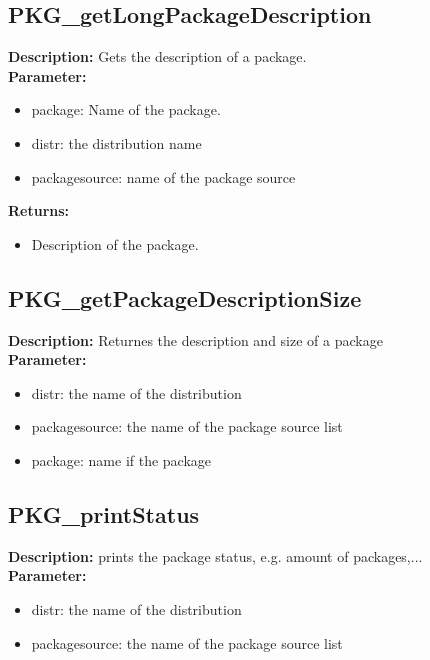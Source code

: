 \subsection{PKG\_getLongPackageDescription}
\textbf{Description:} Gets the description of a package.\\
\textbf{Parameter:}
\begin{itemize}
\item package: Name of the package.
\item distr: the distribution name
\item packagesource: name of the package source
\end{itemize}
\textbf{Returns:}
\begin{itemize}
\item Description of the package.
\end{itemize}

\subsection{PKG\_getPackageDescriptionSize}
\textbf{Description:} Returnes the description and size of a package\\
\textbf{Parameter:}
\begin{itemize}
\item distr: the name of the distribution
\item packagesource: the name of the package source list
\item package: name if the package
\end{itemize}

\subsection{PKG\_printStatus}
\textbf{Description:} prints the package status, e.g. amount of packages,...\\
\textbf{Parameter:}
\begin{itemize}
\item distr: the name of the distribution
\item packagesource: the name of the package source list
\end{itemize}

